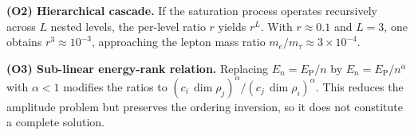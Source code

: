     \medskip
    \noindent\textbf{(O2) Hierarchical cascade.}
    If the saturation process operates recursively across $L$ nested levels, the
    per-level ratio $r$ yields $r^L$.
    With $r \approx 0.1$ and $L = 3$, one obtains $r^3 \approx 10^{-3}$,
    approaching the lepton mass ratio $m_e/m_\tau \approx 3 \times 10^{-4}$.

    \medskip
    \noindent\textbf{(O3) Sub-linear energy-rank relation.}
    Replacing $E_n = E_{\mathrm{P}}/n$ by $E_n = E_{\mathrm{P}}/n^\alpha$ with
    $\alpha < 1$ modifies the ratios to
    $(c_i\,\dim\rho_j)^\alpha / (c_j\,\dim\rho_i)^\alpha$.
    This reduces the amplitude problem but preserves the ordering inversion, so it
    does not constitute a complete solution.
